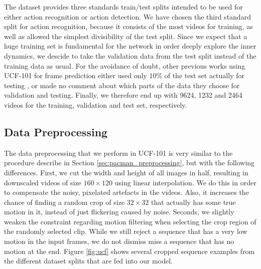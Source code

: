 The dataset provides three standards train/test splits intended to be used for either action recognition or action detection. We have chosen the third standard split for action recognition, because it consists of the most videos for training, as well as allowed the simplest divisibility of the test split. Since we expect that a huge training set is fundamental for the network in order deeply explore the inner dynamics, we descide to take the validation data from the test split instead of the training data as usual. For the avoidance of doubt, other previous works using UCF-101 for frame prediction either used only $ 10\% $ of the test set actually for testing \parencite[p. 12]{deep_multiscale_video_pred}, or made no comment about which parts of the data they choose for validation and testing. Finally, we therefore end up with \num{9624}, \num{1232} and \num{2464} videos for the training, validation and test set, respectively.


\subsection{Data Preprocessing}

The data preprocessing that we perform in UCF-101 is very similar to the procedure describe in Section \ref{sec:pacman_preprocessing}, but with the following differences. First, we cut the width and height of all images in half, resulting in downscaled videos of size $160 \times 120$ using linear interpolation. We do this in order to compensate the noisy, pixelated artefacts in the videos. Also, it increases the chance of finding a random crop of size $ 32 \times 32 $ that actually has some true motion in it, instead of just flickering caused by noise. Seconds, we slightly weaken the constraint regarding motion filtering when selecting the crop region of the randomly selected clip. While we still reject a sequence that has a very low motion in the input frames, we do not dismiss miss a sequence that has no motion at the end. Figure \ref{fig:ucf} shows several cropped sequence examples from the different dataset splits that are fed into our model.

